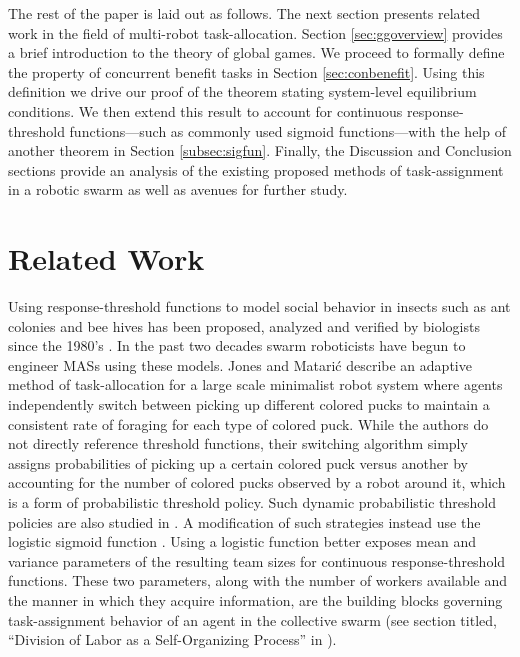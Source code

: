 \documentclass[conference]{ieeeconf}
\begin{document}
The rest of the paper is laid out as follows. The next section presents related work in the field of multi-robot task-allocation. Section \ref{sec:ggoverview} provides a brief introduction to the theory of global games. We proceed to formally define the property of concurrent benefit tasks in Section \ref{sec:conbenefit}. Using this definition we drive our proof of the theorem stating system-level equilibrium conditions. We then extend this result to account for continuous response-threshold functions---such as commonly used sigmoid functions---with the help of another theorem in Section \ref{subsec:sigfun}. Finally, the Discussion and Conclusion sections provide an analysis of the existing proposed methods of task-assignment in a robotic swarm as well as avenues for further study.

\section{Related Work}\label{sec:rw}
Using response-threshold functions to model social behavior in insects such as ant colonies \cite{Bonabeau1996, Bonabeau1997} and bee hives \cite{Robinson1987, Robinson1992, PageJr1990} has been proposed, analyzed and verified by biologists since the 1980's \cite{Theraulaz1998}. In the past two decades swarm roboticists have begun to engineer MASs using these models. Jones and Matari\'c \cite{Jones2004} describe an adaptive method of task-allocation for a large scale minimalist robot system where agents independently switch between picking up different colored pucks to maintain a consistent rate of foraging for each type of colored puck. While the authors do not directly reference threshold functions, their switching algorithm simply assigns probabilities of picking up a certain colored puck versus another by accounting for the number of colored pucks observed by a robot around it, which is a form of probabilistic threshold policy. Such dynamic  probabilistic threshold policies are also studied in \cite{Nouyan2002}. A modification of such strategies instead use the logistic sigmoid function \cite{Kanakia2014}. Using a logistic function better exposes mean and variance parameters of the resulting team sizes for continuous response-threshold functions. These two parameters, along with the number of workers available and the manner in which they acquire information, are the building blocks governing task-assignment behavior of an agent in the collective swarm (see section titled, ``Division of Labor as a Self-Organizing Process'' in \cite{Robinson1992}). 
\end{document}
